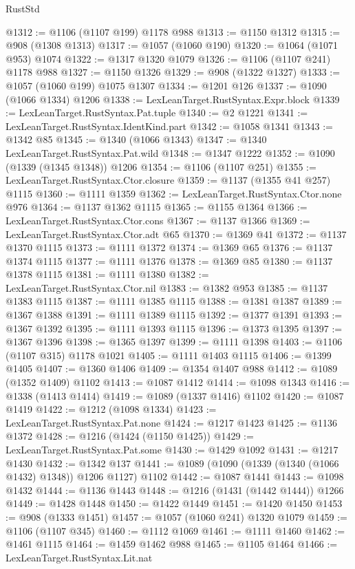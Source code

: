 \begin{lexlean}{RustStd}
\begin{coremodule}
{\begin{coremodule}
{{{{{{{{{{{{{{{{{{{{{{{{{{@1312 := @1106 (@1107 @199) @1178 @988
@1313 := @1150 @1312
@1315 := @908 (@1308 @1313)
@1317 := @1057 (@1060 @190)
@1320 := @1064 (@1071 @953) @1074
@1322 := @1317 @1320 @1079
@1326 := @1106 (@1107 @241) @1178 @988
@1327 := @1150 @1326
@1329 := @908 (@1322 @1327)
@1333 := @1057 (@1060 @199) @1075 @1307
@1334 := @1201 @126
@1337 := @1090 (@1066 @1334) @1206
@1338 := LexLeanTarget.RustSyntax.Expr.block
@1339 := LexLeanTarget.RustSyntax.Pat.tuple
@1340 := @2 @1221
@1341 := LexLeanTarget.RustSyntax.IdentKind.part
@1342 := @1058 @1341
@1343 := @1342 @85
@1345 := @1340 (@1066 @1343)
@1347 := @1340 LexLeanTarget.RustSyntax.Pat.wild
@1348 := @1347 @1222
@1352 := @1090 (@1339 (@1345 @1348)) @1206
@1354 := @1106 (@1107 @251)
@1355 := LexLeanTarget.RustSyntax.Ctor.closure
@1359 := @1137 (@1355 @41 @257) @1115
@1360 := @1111 @1359
@1362 := LexLeanTarget.RustSyntax.Ctor.none @976
@1364 := @1137 @1362 @1115
@1365 := @1155 @1364
@1366 := LexLeanTarget.RustSyntax.Ctor.cons
@1367 := @1137 @1366
@1369 := LexLeanTarget.RustSyntax.Ctor.adt @65
@1370 := @1369 @41
@1372 := @1137 @1370 @1115
@1373 := @1111 @1372
@1374 := @1369 @65
@1376 := @1137 @1374 @1115
@1377 := @1111 @1376
@1378 := @1369 @85
@1380 := @1137 @1378 @1115
@1381 := @1111 @1380
@1382 := LexLeanTarget.RustSyntax.Ctor.nil
@1383 := @1382 @953
@1385 := @1137 @1383 @1115
@1387 := @1111 @1385 @1115
@1388 := @1381 @1387
@1389 := @1367 @1388
@1391 := @1111 @1389 @1115
@1392 := @1377 @1391
@1393 := @1367 @1392
@1395 := @1111 @1393 @1115
@1396 := @1373 @1395
@1397 := @1367 @1396
@1398 := @1365 @1397
@1399 := @1111 @1398
@1403 := @1106 (@1107 @315) @1178 @1021
@1405 := @1111 @1403 @1115
@1406 := @1399 @1405
@1407 := @1360 @1406
@1409 := @1354 @1407 @988
@1412 := @1089 (@1352 @1409) @1102
@1413 := @1087 @1412
@1414 := @1098 @1343
@1416 := @1338 (@1413 @1414)
@1419 := @1089 (@1337 @1416) @1102
@1420 := @1087 @1419
@1422 := @1212 (@1098 @1334)
@1423 := LexLeanTarget.RustSyntax.Pat.none
@1424 := @1217 @1423
@1425 := @1136 @1372
@1428 := @1216 (@1424 (@1150 @1425))
@1429 := LexLeanTarget.RustSyntax.Pat.some
@1430 := @1429 @1092
@1431 := @1217 @1430
@1432 := @1342 @137
@1441 := @1089 (@1090 (@1339 (@1340 (@1066 @1432) @1348)) @1206 @1127) @1102
@1442 := @1087 @1441
@1443 := @1098 @1432
@1444 := @1136 @1443
@1448 := @1216 (@1431 (@1442 @1444)) @1266
@1449 := @1428 @1448
@1450 := @1422 @1449
@1451 := @1420 @1450
@1453 := @908 (@1333 @1451)
@1457 := @1057 (@1060 @241) @1320 @1079
@1459 := @1106 (@1107 @345)
@1460 := @1112 @1069
@1461 := @1111 @1460
@1462 := @1461 @1115
@1464 := @1459 @1462 @988
@1465 := @1105 @1464
@1466 := LexLeanTarget.RustSyntax.Lit.nat
}}}}}}}}}}}}}}}}}}}}}}}}}}
\end{coremodule}}
\end{coremodule}
\end{lexlean}

